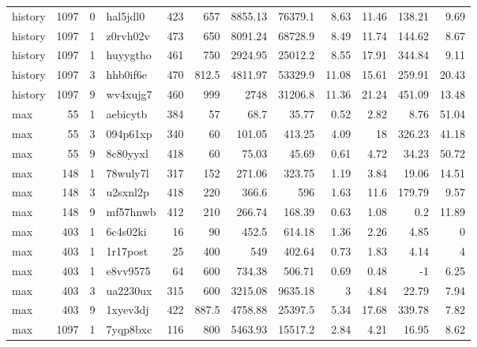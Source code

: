 \documentclass[9pt,twoside,lineno]{pnas-new}
\begin{document}
\begin{table}
\begin{tabular}{lrrlrrrrrrrr}
 history  & 1097 &   0 & hal5jdl0 & 423 &    657   &  8855.13 & 76379.1  &  8.63 &  11.46 & 138.21 &         9.69 \\
 history  & 1097 &   1 & z0rvh02v & 473 &    650   &  8091.24 & 68728.9  &  8.49 &  11.74 & 144.62 &         8.67 \\
 history  & 1097 &   1 & huyygtho & 461 &    750   &  2924.95 & 25012.2  &  8.55 &  17.91 & 344.84 &         9.11 \\
 history  & 1097 &   3 & hhb0if6e & 470 &    812.5 &  4811.97 & 53329.9  & 11.08 &  15.61 & 259.91 &        20.43 \\
 history  & 1097 &   9 & wv4xujg7 & 460 &    999   &  2748    & 31206.8  & 11.36 &  21.24 & 451.09 &        13.48 \\
 max      &   55 &   1 & aebicytb & 384 &     57   &    68.7  &    35.77 &  0.52 &   2.82 &   8.76 &        51.04 \\
 max      &   55 &   3 & 094p61xp & 340 &     60   &   101.05 &   413.25 &  4.09 &  18    & 326.23 &        41.18 \\
 max      &   55 &   9 & 8c80yyxl & 418 &     60   &    75.03 &    45.69 &  0.61 &   4.72 &  34.23 &        50.72 \\
 max      &  148 &   1 & 78wuly7l & 317 &    152   &   271.06 &   323.75 &  1.19 &   3.84 &  19.06 &        14.51 \\
 max      &  148 &   3 & u2sxnl2p & 418 &    220   &   366.6  &   596    &  1.63 &  11.6  & 179.79 &         9.57 \\
 max      &  148 &   9 & mf57hnwb & 412 &    210   &   266.74 &   168.39 &  0.63 &   1.08 &   0.2  &        11.89 \\
 max      &  403 &   1 & 6c4s02ki &  16 &     90   &   452.5  &   614.18 &  1.36 &   2.26 &   4.85 &         0    \\
 max      &  403 &   1 & 1r17post &  25 &    400   &   549    &   402.64 &  0.73 &   1.83 &   4.14 &         4    \\
 max      &  403 &   1 & e8vv9575 &  64 &    600   &   734.38 &   506.71 &  0.69 &   0.48 &  -1    &         6.25 \\
 max      &  403 &   3 & ua2230ux & 315 &    600   &  3215.08 &  9635.18 &  3    &   4.84 &  22.79 &         7.94 \\
 max      &  403 &   9 & 1xyev3dj & 422 &    887.5 &  4758.88 & 25397.5  &  5.34 &  17.68 & 339.78 &         7.82 \\
 max      & 1097 &   1 & 7yqp8bxc & 116 &    800   &  5463.93 & 15517.2  &  2.84 &   4.21 &  16.95 &         8.62 \\

\end{tabular}
\end{table}
\end{document}
